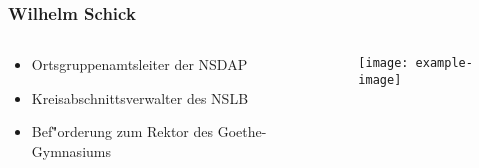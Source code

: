 \documentclass{beamer}
\date{02. Juli 2018}
\begin{document}
\beamertemplatenavigationsymbolsempty
\begin{frame}
\frametitle{Wilhelm Schick}
        \begin{columns}[T]
            \begin{column}{.4\textwidth}
                \begin{itemize}[<+->]
            \item Ortsgruppenamtsleiter der NSDAP 
            \item Kreisabschnittsverwalter des NSLB
            \item Bef\""{o}rderung zum Rektor des Goethe-Gymnasiums
        \end{itemize} 
        \end{column}
        \begin{column}{.55\textwidth}
        \texttt{[image: example-image]}\\
    \end{column}
\end{columns}
\end{frame}
\end{document}
